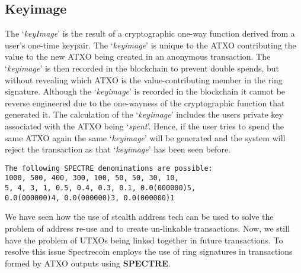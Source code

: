 \subsection{Keyimage}
The ‘\textit{keyImage}’ is the result of a cryptographic one-way function derived
from a user’s one-time keypair. The ‘\textit{keyimage}’ is unique to the ATXO
contributing the value to the new ATXO being created in an anonymous
transaction. The ‘\textit{keyimage}’ is then recorded in the blockchain to prevent
double spends, but without revealing which ATXO is the value-contributing
member in the ring signature. Although the ‘\textit{keyimage}’ is recorded in the
blockchain it cannot be reverse engineered due to the one-wayness of the
cryptographic function that generated it. The calculation of the ‘\textit{keyimage}’
includes the users private key associated with the ATXO being ‘\textit{spent}’.
Hence, if the user tries to spend the same ATXO again the same ‘\textit{keyimage}’
will be generated and the system will reject the transaction as that
‘\textit{keyimage}’ has been seen before.



\begin{lstlisting}
The following SPECTRE denominations are possible:
1000, 500, 400, 300, 100, 50, 50, 30, 10,
5, 4, 3, 1, 0.5, 0.4, 0.3, 0.1, 0.0(000000)5,
0.0(000000)4, 0.0(000000)3, 0.0(000000)1
\end{lstlisting}



We have seen how the use of stealth address tech can be used to solve the
problem of address re-use and to create un-linkable transactions. Now, we
still have the problem of UTXOs being linked together in future transactions.
To resolve this issue Spectrecoin employs the use of ring signatures in
transactions formed by ATXO outputs using \textbf{SPECTRE}.
